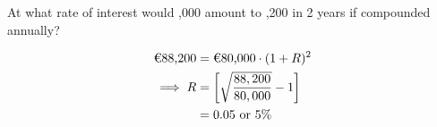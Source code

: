 

\question[2]  At what rate of interest would ,000 amount to ,200
in 2 years if compounded annually?


\ifprintanswers
\fi 

\begin{solution}[\mcq]
	\begin{align}
		\text{\texteuro 88,200} &= \text{\texteuro 80,000}\cdot(1 + R)^2 \\
		\implies R &= \left[\sqrt{\dfrac{88,200}{80,000}} - 1 \right] \\
		              &= 0.05 \text{ or 5\%}
	\end{align}
\end{solution}
\ifprintanswers\begin{codex}\end{codex}\fi
